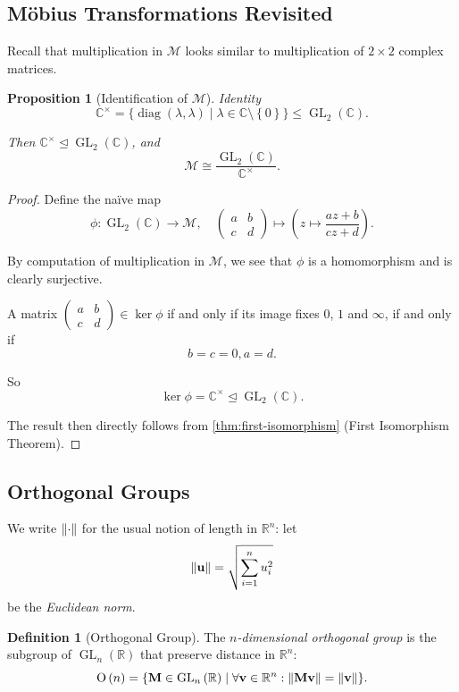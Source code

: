 \documentclass{article}
\newtheorem{proposition}[theorem]{Proposition}
\theoremstyle{definition}
\newtheorem{definition}[theorem]{Definition}
\theoremstyle{remark}
\newcommand{\pqty}[1]{\left(#1\right)}
\newcommand{\Bqty}[1]{\left\{#1\right\}}
\newcommand{\set}[2]{\{#1\mid #2\}}
\newcommand{\flatfrac}[2]{\frac{#1}{#2}}
\newcommand{\function}[5]{#1:#2\to #3,\quad #4\mapsto #5}
\newcommand{\pmqty}[1]{\begin{pmatrix}#1\end{pmatrix}}
\newcommand{\multiplicative}{^{\times}}
\newcommand{\isomorphic}{\cong}
\newcommand{\normalsub}{\trianglelefteq}
\newcommand{\subgroup}{\leq}
\newcommand{\RR}{\mathbb{R}}
\newcommand{\CC}{\mathbb{C}}
\newcommand{\GL}{\operatorname{GL}}
\DeclarePairedDelimiter{\norm}{\lVert}{\rVert}
\newcommand{\mobius}{\mathcal{M}}
\newcommand{\Or}{\operatorname{O}}
\begin{document}
\subsection{M\"{o}bius Transformations Revisited}
\label{sec:mobius-transformations-revisited}

Recall that multiplication in \(\mobius\) looks similar to multiplication of \(2 \times 2\) complex matrices.

\begin{proposition}[Identification of \(\mobius\)]
    \label{prop:identification-of-mobius-group}%
    Identity
    \[
        \CC\multiplicative = \set{\operatorname{diag}\pqty{\lambda, \lambda}}{\lambda \in \CC \setminus \Bqty{0}} \subgroup \GL_2\pqty{\CC}.
    \]

    Then \(\CC\multiplicative \normalsub \GL_2\pqty{\CC}\), and
    \[
        \mobius \isomorphic \flatfrac{\GL_2\pqty{\CC}}{\CC\multiplicative}.
    \]
\end{proposition}

\begin{proof}
    Define the na\"{i}ve map
    \[
        \function{\phi}{\GL_2\pqty{\CC}}{\mobius}{
            \pmqty{a & b \\ c & d}}{\pqty{z \mapsto \frac{az + b}{cz + d}}}.
    \]

    By computation of multiplication in \(\mobius\), we see that \(\phi\) is a homomorphism and is clearly surjective.

    A matrix \(\pmqty{a & b \\ c & d} \in \ker \phi\) if and only if its image fixes \(0\), \(1\) and \(\infty\), if and only if
    \[
        b = c = 0, a = d.
    \]

    So
    \[
        \ker \phi = \CC\multiplicative \normalsub \GL_2\pqty{\CC}.
    \]

    The result then directly follows from \autoref{thm:first-isomorphism} (First Isomorphism Theorem).
\end{proof}

\subsection{Orthogonal Groups}
\label{sec:orthogonal-groups}

We write \(\norm{\cdot}\) for the usual notion of length in \(\RR^n\): let
\[
    \norm{\vb{u}} = \sqrt{\sum_{i = 1}^{n} u_i^2}
\]
be the \emph{Euclidean norm}.

\begin{definition}[Orthogonal Group]
    \label{def:orthogonal-group}%
    The \emph{\(n\)-dimensional orthogonal group} is the subgroup of \(\GL_n\pqty{\RR}\) that preserve distance in \(\RR^n\):
    \[
        \Or\pqty{n} = \set{\vb{M} \in \GL_n\pqty{\RR}}{\forall \vb{v} \in \RR^n: \norm{\vb{Mv}} = \norm{\vb{v}}}.
    \]
\end{definition}
\end{document}
